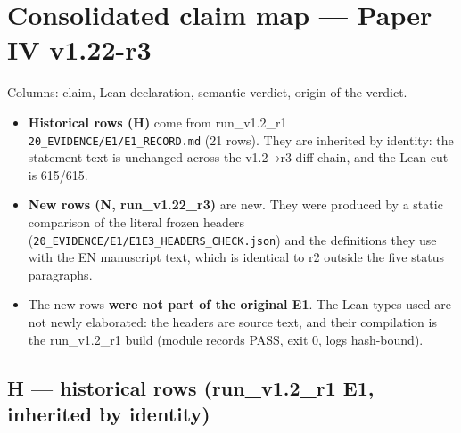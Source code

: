 \documentclass[
]{article}
\author{}
\date{}
\providecommand{\tightlist}{%
  \setlength{\itemsep}{0pt}\setlength{\parskip}{0pt}}
\begin{document}
\section{Consolidated claim map --- Paper IV
v1.22-r3}\label{consolidated-claim-map--paper-iv-v122-r3}

Columns: claim, Lean declaration, semantic verdict, origin of the
verdict.

\begin{itemize}
\tightlist
\item
  \textbf{Historical rows (H)} come from run\_v1.2\_r1
  \texttt{20\_EVIDENCE/E1/E1\_RECORD.md} (21 rows). They are inherited
  by identity: the statement text is unchanged across the v1.2→r3 diff
  chain, and the Lean cut is 615/615.
\item
  \textbf{New rows (N, run\_v1.22\_r3)} are new. They were produced by a
  static comparison of the literal frozen headers
  (\texttt{20\_EVIDENCE/E1/E1E3\_HEADERS\_CHECK.json}) and the
  definitions they use with the EN manuscript text, which is identical
  to r2 outside the five status paragraphs.
\item
  The new rows \textbf{were not part of the original E1}. The Lean types
  used are not newly elaborated: the headers are source text, and their
  compilation is the run\_v1.2\_r1 build (module records PASS, exit 0,
  logs hash-bound).
\end{itemize}

\subsection{H --- historical rows (run\_v1.2\_r1 E1, inherited by
identity)}\label{h--historical-rows-run_v12_r1-e1-inherited-by-identity}
\end{document}
